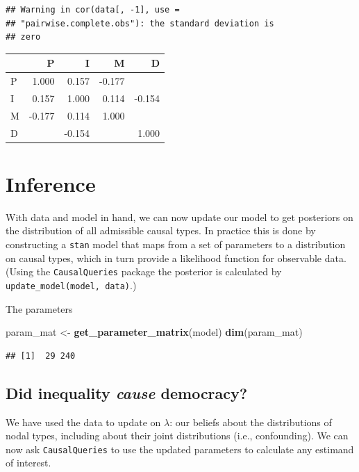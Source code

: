 \documentclass[
  12pt,
]{book}
\newenvironment{Shaded}{\begin{snugshade}}{\end{snugshade}}
\newcommand{\KeywordTok}[1]{\textcolor[rgb]{0.13,0.29,0.53}{\textbf{#1}}}
\newcommand{\NormalTok}[1]{#1}
\newcommand{\StringTok}[1]{\textcolor[rgb]{0.31,0.60,0.02}{#1}}
\begin{document}
\begin{verbatim}
## Warning in cor(data[, -1], use =
## "pairwise.complete.obs"): the standard deviation is
## zero
\end{verbatim}

\begin{tabular}{l|r|r|r|r}
\hline
  & P & I & M & D\\
\hline
P & 1.000 & 0.157 & -0.177 & \\
\hline
I & 0.157 & 1.000 & 0.114 & -0.154\\
\hline
M & -0.177 & 0.114 & 1.000 & \\
\hline
D &  & -0.154 &  & 1.000\\
\hline
\end{tabular}

\hypertarget{inference}{%
\section{Inference}\label{inference}}

With data and model in hand, we can now update our model to get posteriors on the distribution of all admissible causal types. In practice this is done by constructing a \texttt{stan} model that maps from a set of parameters to a distribution on causal types, which in turn provide a likelihood function for observable data. (Using the \texttt{CausalQueries} package the posterior is calculated by \texttt{update\_model(model,\ data)}.)

The parameters

\begin{Shaded}
\begin{Highlighting}[]
\NormalTok{param_mat <-}\StringTok{ }\KeywordTok{get_parameter_matrix}\NormalTok{(model)}
\KeywordTok{dim}\NormalTok{(param_mat)}
\end{Highlighting}
\end{Shaded}

\begin{verbatim}
## [1]  29 240
\end{verbatim}

\hypertarget{did-inequality-cause-democracy}{%
\subsection{\texorpdfstring{Did inequality \emph{cause} democracy?}{Did inequality cause democracy?}}\label{did-inequality-cause-democracy}}

We have used the data to update on \(\lambda\): our beliefs about the distributions of nodal types, including about their joint distributions (i.e., confounding). We can now ask \texttt{CausalQueries} to use the updated parameters to calculate any estimand of interest.
\end{document}
